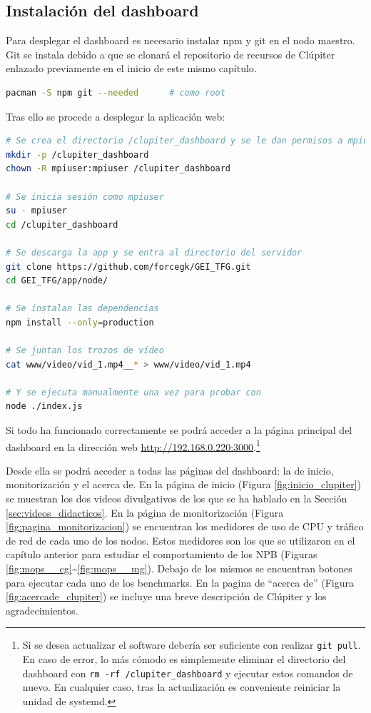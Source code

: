 \subsection{Instalación del dashboard}
Para desplegar el dashboard es necesario instalar npm y git en el nodo maestro. Git se instala debido a que se clonará el repositorio de recursos de Clúpiter enlazado previamente en el inicio de este mismo capítulo.
\begin{lstlisting}[language=bash]
pacman -S npm git --needed      # como root
\end{lstlisting}

Tras ello se procede a desplegar la aplicación web:
\begin{lstlisting}[language=bash]
# Se crea el directorio /clupiter_dashboard y se le dan permisos a mpiuser
mkdir -p /clupiter_dashboard
chown -R mpiuser:mpiuser /clupiter_dashboard

# Se inicia sesión como mpiuser
su - mpiuser
cd /clupiter_dashboard

# Se descarga la app y se entra al directorio del servidor
git clone https://github.com/forcegk/GEI_TFG.git
cd GEI_TFG/app/node/

# Se instalan las dependencias
npm install --only=production

# Se juntan los trozos de vídeo
cat www/video/vid_1.mp4__* > www/video/vid_1.mp4

# Y se ejecuta manualmente una vez para probar con
node ./index.js
\end{lstlisting}

Si todo ha funcionado correctamente se podrá acceder a la página principal del dashboard en la dirección web \url{http://192.168.0.220:3000}.\footnote{Si se desea actualizar el software debería ser suficiente con realizar \texttt{git pull}. En caso de error, lo más cómodo es simplemente eliminar el directorio del dashboard con \texttt{rm -rf /clupiter\_dashboard} y ejecutar estos comandos de nuevo. En cualquier caso, tras la actualización es conveniente reiniciar la unidad de systemd.} 

Desde ella se podrá acceder a todas las páginas del dashboard: la de inicio, monitorización y el acerca de. En la página de inicio (Figura \ref{fig:inicio_clupiter}) se muestran los dos videos divulgativos de los que se ha hablado en la Sección \ref{sec:videos_didacticos}. En la página de monitorización (Figura \ref{fig:pagina_monitorizacion}) se encuentran los medidores de uso de CPU y tráfico de red de cada uno de los nodos. Estos medidores son los que se utilizaron en el capítulo anterior para estudiar el comportamiento de los NPB (Figuras \ref{fig:mops__cg}\textasciitilde\ref{fig:mops__mg}). Debajo de los mismos se encuentran botones para ejecutar cada uno de los benchmarks. En la pagina de ``acerca de'' (Figura \ref{fig:acercade_clupiter}) se incluye una breve descripción de Clúpiter y los agradecimientos. 

